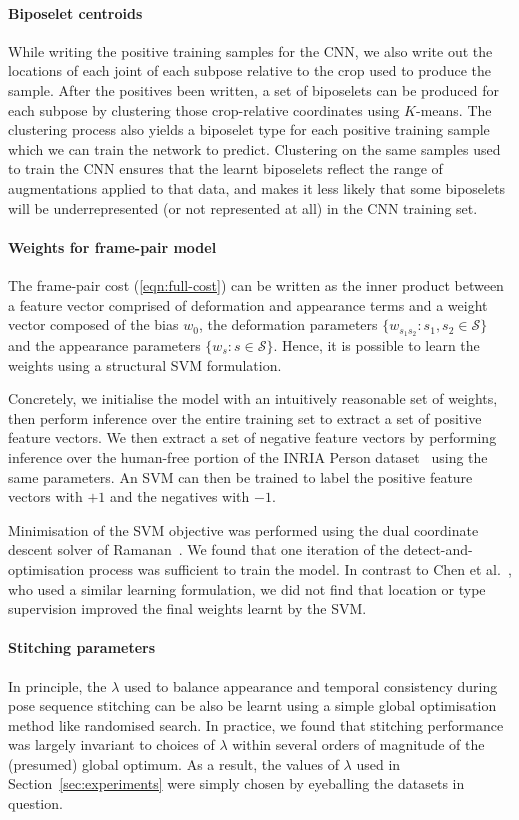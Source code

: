 \documentclass[runningheads]{llncs}
\begin{document}
\paragraph{Biposelet centroids} While writing the positive training samples for
the CNN, we also write out the locations of each joint of each subpose relative
to the crop used to produce the sample. After the positives been written, a set
of biposelets can be produced for each subpose by clustering those crop-relative
coordinates using $K$-means. The clustering process also yields a biposelet type
for each positive training sample which we can train the network to predict.
Clustering on the same samples used to train the CNN ensures that the learnt
biposelets reflect the range of augmentations applied to that data, and makes it
less likely that some biposelets will be underrepresented (or not represented at
all) in the CNN training set.

\paragraph{Weights for frame-pair model} The frame-pair cost
(\ref{eqn:full-cost}) can be written as the inner product between a feature
vector comprised of deformation and appearance terms and a weight vector
composed of the bias $w_0$, the deformation parameters $\{w_{s_1 s_2} : s_1, s_2
\in \mathcal S\}$ and the appearance parameters $\{w_s : s \in \mathcal S\}$.
Hence, it is possible to learn the weights using a structural SVM formulation.

Concretely, we initialise the model with an intuitively reasonable set of
weights, then perform inference over the entire training set to extract a set of
positive feature vectors. We then extract a set of negative feature vectors by
performing inference over the human-free portion of the INRIA Person
dataset~\cite{dalal2005histograms} using the same parameters. An SVM can then be
trained to label the positive feature vectors with $+1$ and the negatives with
$-1$.

Minimisation of the SVM objective was performed using the dual coordinate
descent solver of Ramanan~\cite{ramanan2013dual}. We found that one iteration of
the detect-and-optimisation process was sufficient to train the model. In
contrast to Chen et al.~\cite{chen2014articulate}, who used a similar learning
formulation, we did not find that location or type supervision improved the
final weights learnt by the SVM.

\paragraph{Stitching parameters} In principle, the $\lambda$ used to balance
appearance and temporal consistency during pose sequence stitching can be also
be learnt using a simple global optimisation method like randomised search. In
practice, we found that stitching performance was largely invariant to choices
of $\lambda$ within several orders of magnitude of the (presumed) global
optimum. As a result, the values of $\lambda$ used in
Section~\ref{sec:experiments} were simply chosen by eyeballing the datasets in
question.
\end{document}
